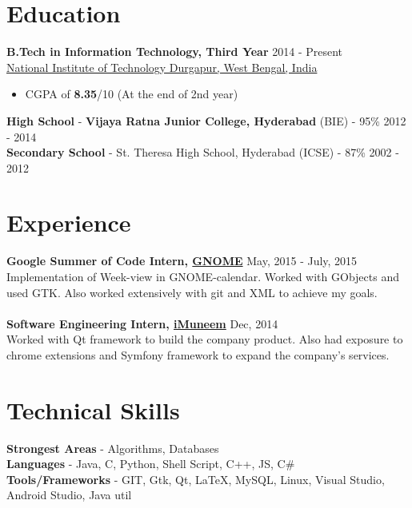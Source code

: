\documentclass[margin, centered]{res}
\begin{document}
\begin{resume}

\section{Education}
\textbf{B.Tech in Information Technology, Third Year} \hfill 2014 - Present \\
\href{http://nitdgp.ac.in/}{National Institute of Technology Durgapur, West Bengal, India}
\begin{itemize}
 \item CGPA of \textbf{8.35}/10 (At the end of 2nd year)
\end{itemize}
\textbf{High School} - \textbf{Vijaya Ratna Junior College, Hyderabad} (BIE) - 95\% \hfill 2012 - 2014 \\
\textbf{Secondary School} - St. Theresa High School, Hyderabad (ICSE) - 87\% \hfill 2002 - 2012
 
\section{Experience}
\textbf{Google Summer of Code Intern, \href{https://summerofcode.withgoogle.com/archive/2016/projects/5194537727164416/}{GNOME}} \hfill May, 2015 - July, 2015\\
Implementation of Week-view in GNOME-calendar. Worked with GObjects and used GTK. Also worked extensively with git and XML to achieve my goals.   \\
\\
\textbf{Software Engineering Intern, \href{http://www.imuneem.com/}{iMuneem}} \hfill Dec, 2014 \\
Worked with Qt framework to build the company product. Also had exposure to chrome extensions and Symfony framework to expand the company's services. 

\section{Technical \hspace{2mm} Skills}
\textbf{Strongest Areas} - Algorithms, Databases\\
\textbf{Languages} - Java, C, Python, Shell Script, C++, JS, C#\\
\textbf{Tools/Frameworks} - GIT, Gtk, Qt, \LaTeX, MySQL, Linux, Visual Studio, Android Studio, Java util


\end{resume}
\end{document}
